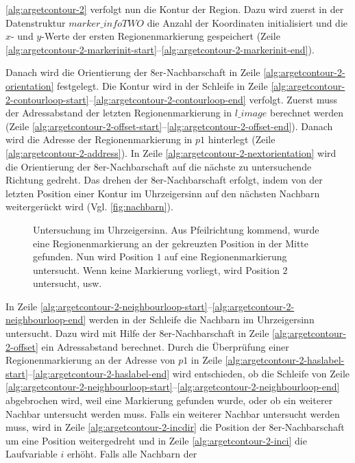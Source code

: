 \autoref{alg:argetcontour-2} verfolgt nun die Kontur der Region. Dazu wird zuerst in der Datenstruktur
 $\mathit{marker\_infoTWO}$ die Anzahl der Koordinaten initialisiert und die $x$- und $y$-Werte der ersten
 Regionenmarkierung gespeichert (Zeile
 \ref{alg:argetcontour-2-markerinit-start}--\ref{alg:argetcontour-2-markerinit-end}).

Danach wird die Orientierung der 8er-Nachbarschaft in Zeile \ref{alg:argetcontour-2-orientation} festgelegt. Die
 Kontur wird in der Schleife in Zeile
 \ref{alg:argetcontour-2-contourloop-start}--\ref{alg:argetcontour-2-contourloop-end} verfolgt. Zuerst muss der
 Adressabstand der letzten Regionenmarkierung in $\mathit{l\_image}$ berechnet werden (Zeile
 \ref{alg:argetcontour-2-offset-start}--\ref{alg:argetcontour-2-offset-end}). Danach wird die Adresse der
 Regionenmarkierung in $\mathit{p1}$ hinterlegt (Zeile \ref{alg:argetcontour-2-address}). In Zeile
 \ref{alg:argetcontour-2-nextorientation} wird die Orientierung der 8er-Nachbarschaft auf die nächste zu untersuchende
 Richtung gedreht. Das drehen der 8er-Nachbarschaft erfolgt, indem von der letzten Position einer Kontur im
 Uhrzeigersinn auf den nächsten Nachbarn weitergerückt wird (Vgl. \autoref{fig:nachbarn}).
\begin{figure}[!ht]
	\centering
	
	\caption{Untersuchung im Uhrzeigersinn. Aus Pfeilrichtung kommend, wurde eine Regionenmarkierung an der gekreuzten
	 Position in der Mitte gefunden. Nun wird Position $1$ auf eine Regionenmarkierung untersucht. Wenn keine
	 Markierung vorliegt, wird Position $2$ untersucht, usw.}
	\label{fig:nachbarn}
\end{figure}
In Zeile \ref{alg:argetcontour-2-neighbourloop-start}--\ref{alg:argetcontour-2-neighbourloop-end} werden in der
 Schleife die Nachbarn im Uhrzeigersinn untersucht. Dazu wird mit Hilfe der 8er-Nachbarschaft in Zeile
 \ref{alg:argetcontour-2-offset} ein Adressabstand berechnet. Durch die Überprüfung einer Regionenmarkierung an der
 Adresse von $\mathit{p1}$ in Zeile \ref{alg:argetcontour-2-haslabel-start}--\ref{alg:argetcontour-2-haslabel-end} wird
 entschieden, ob die Schleife von Zeile
 \ref{alg:argetcontour-2-neighbourloop-start}--\ref{alg:argetcontour-2-neighbourloop-end} abgebrochen wird, weil eine
 Markierung gefunden wurde, oder ob ein weiterer Nachbar untersucht werden muss. Falls ein weiterer Nachbar untersucht
 werden muss, wird in Zeile \ref{alg:argetcontour-2-incdir} die Position der 8er-Nachbarschaft um eine Position
 weitergedreht und in Zeile \ref{alg:argetcontour-2-inci} die Laufvariable $i$ erhöht. Falls alle Nachbarn der
